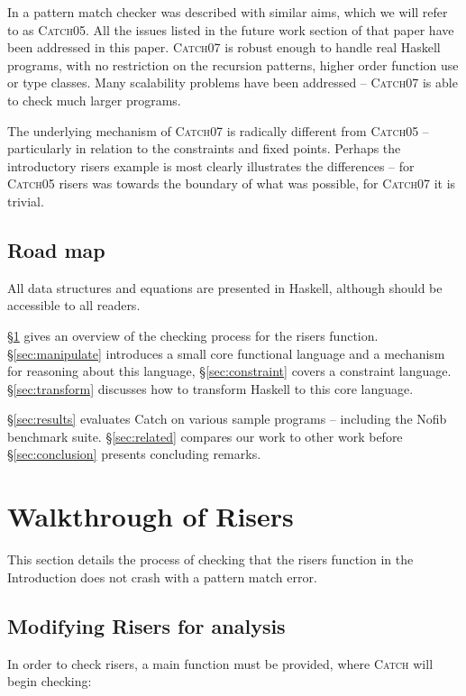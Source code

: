 \documentclass[preprint]{sigplanconf}
\newcommand{\C}[1]{\textsf{#1}}
\newcommand{\catch}{\textsc{Catch}}
\begin{document}
In \citet{me:catch_tfp} a pattern match checker was described with similar aims, which we will refer to as \catch05. All the issues listed in the future work section of that paper have been addressed in this paper. \catch07 is robust enough to handle real Haskell programs, with no restriction on the recursion patterns, higher order function use or type classes. Many scalability problems have been addressed -- \catch07 is able to check much larger programs.

The underlying mechanism of \catch07 is radically different from \catch05 -- particularly in relation to the constraints and fixed points. Perhaps the introductory risers example is most clearly illustrates the differences -- for \catch05 risers was towards the boundary of what was possible, for \catch07 it is trivial.

\subsection{Road map}

All data structures and equations are presented in Haskell, although should be accessible to all readers.

\S\ref{sec:walkthrough} gives an overview of the checking process for the \C{risers} function. \S\ref{sec:manipulate} introduces a small core functional language and a mechanism for reasoning about this language, \S\ref{sec:constraint} covers a constraint language. \S\ref{sec:transform} discusses how to transform Haskell to this core language.

\S\ref{sec:results} evaluates Catch on various sample programs -- including the Nofib benchmark suite. \S\ref{sec:related} compares our work to other work before \S\ref{sec:conclusion} presents concluding remarks.

\section{Walkthrough of Risers}
\label{sec:walkthrough}

This section details the process of checking that the \C{risers} function in the Introduction does not crash with a pattern match error.

\subsection{Modifying Risers for analysis}

In order to check \C{risers}, a \C{main} function must be provided, where \catch{} will begin checking:
\end{document}
